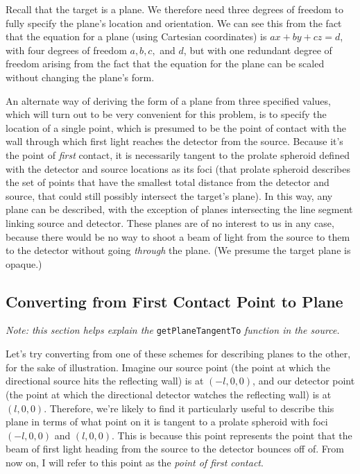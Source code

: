 \documentclass[11pt]{article}
\begin{document}
Recall that the target is a plane. We therefore need three degrees of freedom to fully specify the plane's location and orientation. We can see this from the fact that the equation for a plane (using Cartesian coordinates) is $ax + by + cz = d$, with four degrees of freedom $a, b, c,$ and $d$, but with one redundant degree of freedom arising from the fact that the equation for the plane can be scaled without changing the plane's form. 

An alternate way of deriving the form of a plane from three specified values, which will turn out to be very convenient for this problem, is to specify the location of a single point, which is presumed to be the point of contact with the wall through which first light reaches the detector from the source. Because it's the point of \emph{first} contact, it is necessarily tangent to the prolate spheroid defined with the detector and source locations as its foci (that prolate spheroid describes the set of points that have the smallest total distance from the detector and source, that could still possibly intersect the target's plane). In this way, any plane can be described, with the exception of planes intersecting the line segment linking source and detector. These planes are of no interest to us in any case, because there would be no way to shoot a beam of light from the source to them to the detector without going \emph{through} the plane. (We presume the target plane is opaque.)

\subsection{Converting from First Contact Point to Plane}

\emph{Note: this section helps explain the} \texttt{getPlaneTangentTo} \emph{function in the source.}

Let's try converting from one of these schemes for describing planes to the other, for the sake of illustration. Imagine our source point (the point at which the directional source hits the reflecting wall) is at $(-l,0,0)$, and our detector point (the point at which the directional detector watches the reflecting wall) is at $(l,0,0)$. Therefore, we're likely to find it particularly useful to describe this plane in terms of what point on it is tangent to a prolate spheroid with foci $(-l,0,0)$ and $(l,0,0)$. This is because this point represents the point that the beam of first light heading from the source to the detector bounces off of. From now on, I will refer to this point as the \emph{point of first contact}. 
\end{document}
